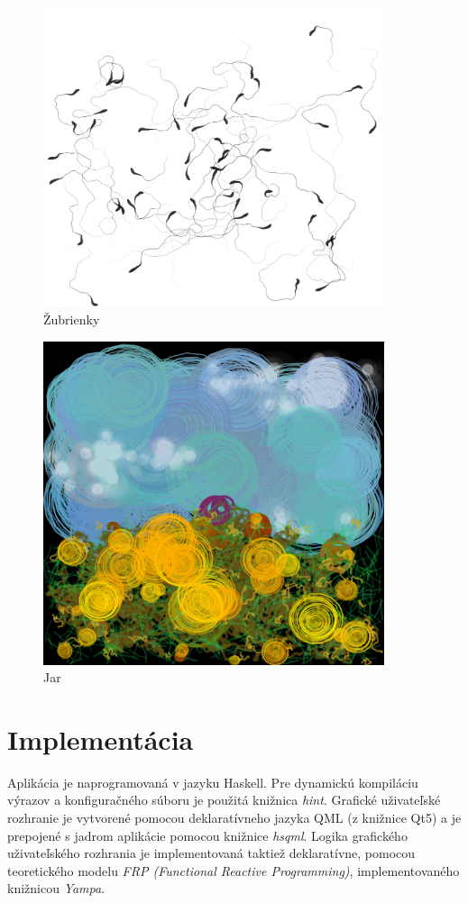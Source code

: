 \documentclass[11pt,a4paper]{article}
\begin{document}
\begin{figure}[!h]
  \centering
  \includegraphics[width=10cm]{images/tadpoles.png}
  \caption{Žubrienky}
\end{figure}

\begin{figure}[!h]
  \centering
  \includegraphics[width=10cm]{images/hill.png}
  \caption{Jar}
\end{figure}

\FloatBarrier


\section{Implementácia}

Aplikácia je naprogramovaná v jazyku Haskell. Pre dynamickú kompiláciu výrazov a
konfiguračného súboru je použitá knižnica \emph{hint}. Grafické uživateľské
rozhranie je vytvorené pomocou deklaratívneho jazyka QML (z knižnice Qt5) a je
prepojené s jadrom aplikácie pomocou knižnice \emph{hsqml}. Logika grafického
uživateľského rozhrania je implementovaná taktiež deklaratívne, pomocou
teoretického modelu \emph{FRP (Functional Reactive Programming)},
implementovaného knižnicou \emph{Yampa}.
\end{document}
